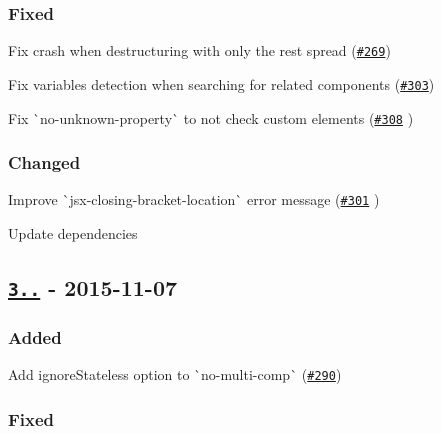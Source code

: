 \subsubsection*{Fixed}


\begin{DoxyItemize}
\item Fix crash when destructuring with only the rest spread (\href{https://github.com/yannickcr/eslint-plugin-react/issues/269}{\tt \#269})
\item Fix variables detection when searching for related components (\href{https://github.com/yannickcr/eslint-plugin-react/issues/303}{\tt \#303})
\item Fix \`{}no-\/unknown-\/property\`{} to not check custom elements (\href{https://github.com/yannickcr/eslint-plugin-react/pull/308}{\tt \#308} )
\end{DoxyItemize}

\subsubsection*{Changed}


\begin{DoxyItemize}
\item Improve \`{}jsx-\/closing-\/bracket-\/location\`{} error message (\href{https://github.com/yannickcr/eslint-plugin-react/pull/301}{\tt \#301} )
\item Update dependencies
\end{DoxyItemize}

\subsection*{\href{https://github.com/yannickcr/eslint-plugin-react/compare/v3.7.1...v3.8.0}{\tt 3..} -\/ 2015-\/11-\/07}

\subsubsection*{Added}


\begin{DoxyItemize}
\item Add ignore\+Stateless option to \`{}no-\/multi-\/comp\`{} (\href{https://github.com/yannickcr/eslint-plugin-react/issues/290}{\tt \#290})
\end{DoxyItemize}

\subsubsection*{Fixed}


